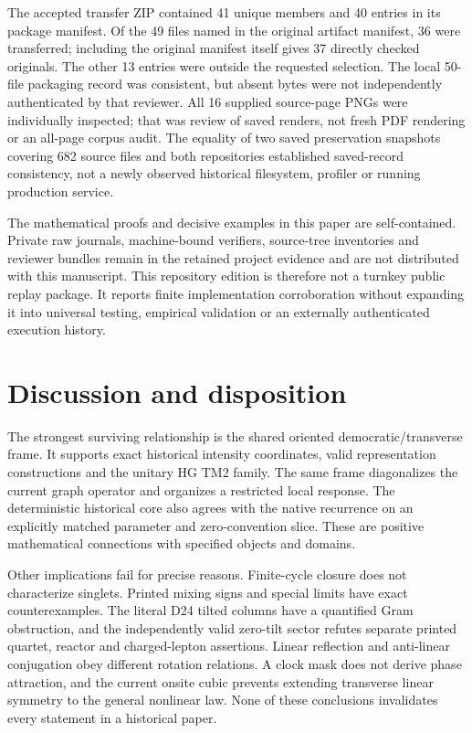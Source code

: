 \documentclass[11pt,a4paper]{article}
\numberwithin{equation}{section}
\begin{document}
The accepted transfer ZIP contained 41 unique members and 40 entries in its package manifest. Of the 49 files named in the original artifact manifest, 36 were transferred; including the original manifest itself gives 37 directly checked originals. The other 13 entries were outside the requested selection. The local 50-file packaging record was consistent, but absent bytes were not independently authenticated by that reviewer. All 16 supplied source-page PNGs were individually inspected; that was review of saved renders, not fresh PDF rendering or an all-page corpus audit. The equality of two saved preservation snapshots covering 682 source files and both repositories established saved-record consistency, not a newly observed historical filesystem, profiler or running production service.

The mathematical proofs and decisive examples in this paper are self-contained. Private raw journals, machine-bound verifiers, source-tree inventories and reviewer bundles remain in the retained project evidence and are not distributed with this manuscript. This repository edition is therefore not a turnkey public replay package. It reports finite implementation corroboration without expanding it into universal testing, empirical validation or an externally authenticated execution history.

\section{Discussion and disposition}\label{sec:discussion}
The strongest surviving relationship is the shared oriented democratic/transverse frame. It supports exact historical intensity coordinates, valid representation constructions and the unitary HG TM2 family. The same frame diagonalizes the current graph operator and organizes a restricted local response. The deterministic historical core also agrees with the native recurrence on an explicitly matched parameter and zero-convention slice. These are positive mathematical connections with specified objects and domains.

Other implications fail for precise reasons. Finite-cycle closure does not characterize singlets. Printed mixing signs and special limits have exact counterexamples. The literal D24 tilted columns have a quantified Gram obstruction, and the independently valid zero-tilt sector refutes separate printed quartet, reactor and charged-lepton assertions. Linear reflection and anti-linear conjugation obey different rotation relations. A clock mask does not derive phase attraction, and the current onsite cubic prevents extending transverse linear symmetry to the general nonlinear law. None of these conclusions invalidates every statement in a historical paper.
\end{document}
